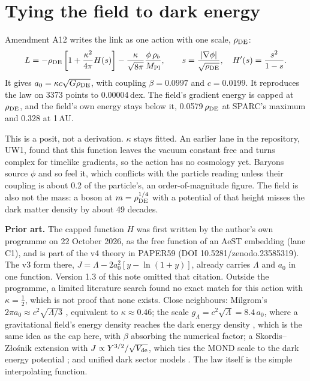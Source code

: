 \documentclass[11pt]{article}
\begin{document}
\section{Tying the field to dark energy}
Amendment A12 writes the link as one action with one scale, $\rho_{\rm DE}$:
\begin{equation}
L=-\rho_{\rm DE}\left[1+\frac{\kappa^2}{4\pi}H(s)\right]-\frac{\kappa}{\sqrt{8\pi}}\frac{\phi\,\rho_b}{M_{\rm Pl}},\qquad s=\frac{|\nabla\phi|}{\sqrt{\rho_{\rm DE}}},\quad H'(s)=\frac{s^2}{1-s}.
\end{equation}
It gives $a_0=\kappa c\sqrt{G\rho_{\rm DE}}$, with coupling $\beta=0.0997$ and $c=0.0199$. It reproduces the law on 3373 points to 0.00004\,dex. The field's gradient energy is capped at $\rho_{\rm DE}$, and the field's own energy stays below it, 0.0579\,$\rho_{\rm DE}$ at SPARC's maximum and 0.328 at 1\,AU.

This is a posit, not a derivation. $\kappa$ stays fitted. An earlier lane in the repository, UW1, found that this function leaves the vacuum constant free and turns complex for timelike gradients, so the action has no cosmology yet. Baryons source $\phi$ and so feel it, which conflicts with the particle reading unless their coupling is about 0.2 of the particle's, an order-of-magnitude figure. The field is also not the mass: a boson at $m=\rho_{\rm DE}^{1/4}$ with a potential of that height misses the dark matter density by about 49 decades.

\textbf{Prior art.} The capped function $H$ was first written by the author's own programme on 22 October 2026, as the free function of an AeST embedding (lane C1), and is part of the v4 theory in PAPER59 (DOI 10.5281/zenodo.23585319). The v3 form there, $J=\Lambda-2a_0^2[y-\ln(1+y)]$, already carries $\Lambda$ and $a_0$ in one function. Version 1.3 of this note omitted that citation. Outside the programme, a limited literature search found no exact match for this action with $\kappa=\tfrac12$, which is not proof that none exists. Close neighbours: Milgrom's $2\pi a_0\approx c^2\sqrt{\Lambda/3}$ \cite{milgrom99}, equivalent to $\kappa\approx0.46$; the scale $g_\Lambda=c^2\sqrt{\Lambda}=8.4\,a_0$, where a gravitational field's energy density reaches the dark energy density \cite{banik22}, which is the same idea as the cap here, with $\beta$ absorbing the numerical factor; a Skordis--Z\l{}o\'snik extension with $J\propto Y^{3/2}/\sqrt{V_{\rm de}}$, which ties the MOND scale to the dark energy potential \cite{tian23}; and unified dark sector models \cite{zhao07,blanchet08}. The law itself is the simple interpolating function.
\end{document}
